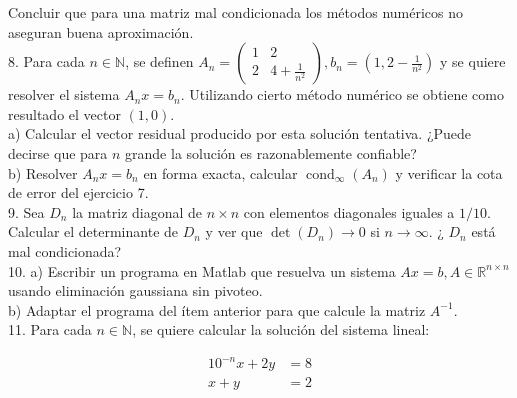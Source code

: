 \documentclass[10pt]{book}
\begin{document}
Concluir que para una matriz mal condicionada los métodos numéricos no aseguran buena aproximación.\\
8. Para cada $n \in \mathbb{N}$, se definen $A_{n}=\left(\begin{array}{cc}1 & 2 \\ 2 & 4+\frac{1}{n^{2}}\end{array}\right), b_{n}=\left(1,2-\frac{1}{n^{2}}\right)$ y se quiere resolver el sistema $A_{n} x=b_{n}$. Utilizando cierto método numérico se obtiene como resultado el vector $(1,0)$.\\
a) Calcular el vector residual producido por esta solución tentativa. ¿Puede decirse que para $n$ grande la solución es razonablemente confiable?\\
b) Resolver $A_{n} x=b_{n}$ en forma exacta, calcular $\operatorname{cond}_{\infty}\left(A_{n}\right)$ y verificar la cota de error del ejercicio 7.\\
9. Sea $D_{n}$ la matriz diagonal de $n \times n$ con elementos diagonales iguales a $1 / 10$. Calcular el determinante de $D_{n}$ y ver que $\operatorname{det}\left(D_{n}\right) \rightarrow 0$ si $n \rightarrow \infty$. ¿ $D_{n}$ está mal condicionada?\\
10. a) Escribir un programa en Matlab que resuelva un sistema $A x=b, A \in \mathbb{R}^{n \times n}$ usando eliminación gaussiana sin pivoteo.\\
b) Adaptar el programa del ítem anterior para que calcule la matriz $A^{-1}$.\\
11. Para cada $n \in \mathbb{N}$, se quiere calcular la solución del sistema lineal:

$$
\begin{aligned}
10^{-n} x+2 y & =8 \\
x+y & =2
\end{aligned}
$$
\end{document}
